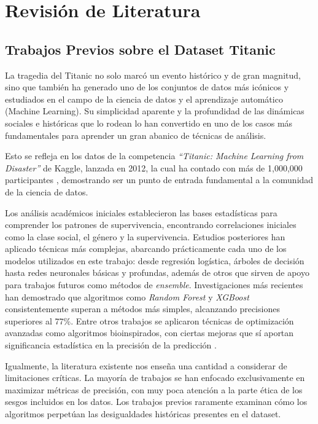 \documentclass[conference]{IEEEtran}
\begin{document}
\section{Revisión de Literatura}

\subsection{Trabajos Previos sobre el Dataset Titanic}
La tragedia del Titanic no solo marcó un evento histórico y de gran magnitud, sino que también ha generado uno de los conjuntos de datos más icónicos y estudiados en el campo de la ciencia de datos y el aprendizaje automático (Machine Learning). Su simplicidad aparente y la profundidad de las dinámicas sociales e históricas que lo rodean lo han convertido en uno de los casos más fundamentales para aprender un gran abanico de técnicas de análisis. 

Esto se refleja en los datos de la competencia \textit{``Titanic: Machine Learning from Disaster''} de Kaggle, lanzada en 2012, la cual ha contado con más de 1,000,000 participantes \cite{kaggle2012titanic}, demostrando ser un punto de entrada fundamental a la comunidad de la ciencia de datos.

Los análisis académicos iniciales establecieron las bases estadísticas para comprender los patrones de supervivencia, encontrando correlaciones iniciales como la clase social, el género y la supervivencia. Estudios posteriores han aplicado técnicas más complejas, abarcando prácticamente cada uno de los modelos utilizados en este trabajo: desde regresión logística, árboles de decisión hasta redes neuronales básicas y profundas, además de otros que sirven de apoyo para trabajos futuros como métodos de \textit{ensemble}. Investigaciones más recientes \cite{ekinci2018titanic, huang2024titanic} han demostrado que algoritmos como \textit{Random Forest} y \textit{XGBoost} consistentemente superan a métodos más simples, alcanzando precisiones superiores al 77\%. Entre otros trabajos se aplicaron técnicas de optimización avanzadas como algoritmos bioinspirados, con ciertas mejoras que sí aportan significancia estadística en la precisión de la predicción \cite{cetiner2025bio}.

Igualmente, la literatura existente nos enseña una cantidad a considerar de limitaciones críticas. La mayoría de trabajos se han enfocado exclusivamente en maximizar métricas de precisión, con muy poca atención a la parte ética de los sesgos incluidos en los datos. Los trabajos previos raramente examinan cómo los algoritmos perpetúan las desigualdades históricas presentes en el dataset. 
\end{document}
